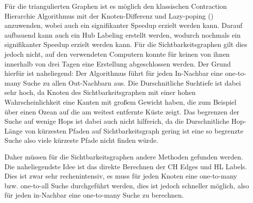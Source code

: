 Für die triangulierten Graphen ist es möglich den klassischen Contraction Hierarchie Algorithmus mit der Knoten-Differenz und Lazy-poping (\cite{geisberger2008contraction}) anzuwenden, wobei auch ein signifikanter Speedup erzielt werden kann. 
Darauf aufbauend kann auch ein Hub Labeling erstellt werden, wodurch nochmals ein signifikanter Speedup erzielt werden kann.
Für die Sichtbarkeitsgraphen gilt dies jedoch nicht, auf den verwendeten Computern konnte für keinen von ihnen innerhalb von drei Tagen eine Erstellung abgeschlossen werden.
Der Grund hierfür ist naheliegend: Der Algorithmus führt für jeden In-Nachbar eine one-to-many Suche zu allen Out-Nachbarn aus.
Die Durschnitliche Suchtiefe ist dabei sehr hoch, da Knoten des Sichtbarkeitsgraphen mit einer hohen Wahrscheinlichkeit eine Kanten mit großem Gewicht haben, die zum Beispiel über einen Ozean auf die am weitest entfernte Küste zeigt.
Das begrenzen der Suche auf wenige Hops ist dabei auch nicht hilfreich, da die Durschnitliche Hop-Länge von kürzesten Pfaden auf Sichtbarkeitsgraph gering ist eine so begrenzte Suche also viele kürzeste Pfade nicht finden würde.

Daher müssen für die Sichtbarkeitsgraphen andere Methoden gefunden werden.
Die naheliegendste Idee ist das direkte Berechnen der CH Edges und HL Labels.
Dies ist zwar sehr rechenintensiv, es muss für jeden Knoten eine one-to-many bzw. one-to-all Suche durchgeführt werden, dies ist jedoch schneller möglich, also für jeden in-Nachbar eine one-to-many Suche zu berechnen.




